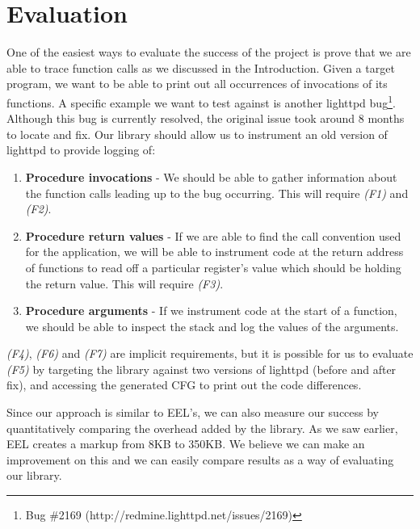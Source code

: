 \chapter{Evaluation}\label{chap:Evaluation}

One of the easiest ways to evaluate the success of the project is prove that we are able to trace function calls as we discussed in the Introduction. Given a target program, we want to be able to print out all occurrences of invocations of its functions. A specific example we want to test against is another lighttpd bug\footnote{Bug \#2169 (http://redmine.lighttpd.net/issues/2169)}. Although this bug is currently resolved, the original issue took around 8 months to locate and fix. Our library should allow us to instrument an old version of lighttpd to provide logging of:

\begin{enumerate}
 \item \textbf{Procedure invocations} - We should be able to gather information about the function calls leading up to the bug occurring. This will require \emph{(F1)} and \emph{(F2)}.
 \item \textbf{Procedure return values} - If we are able to find the call convention used for the application, we will be able to instrument code at the return address of functions to read off a particular register's value which should be holding the return value. This will require \emph{(F3)}.
 \item \textbf{Procedure arguments} - If we instrument code at the start of a function, we should be able to inspect the stack and log the values of the arguments.
\end{enumerate}

\emph{(F4)}, \emph{(F6)} and \emph{(F7)} are implicit requirements, but it is possible for us to evaluate \emph{(F5)} by targeting the library against two versions of lighttpd (before and after fix), and accessing the generated CFG to print out the code differences.

Since our approach is similar to EEL's, we can also measure our success by quantitatively comparing the overhead added by the library. As we saw earlier, EEL creates a markup from 8KB to 350KB. We believe we can make an improvement on this and we can easily compare results as a way of evaluating our library.